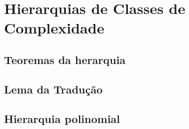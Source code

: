 \chapter{Hierarquias de Classes de Complexidade}




\section{Teoremas da herarquia}

\section{Lema da Tradução}
\label{secao_lema_traducao}



\section{Hierarquia polinomial}
\label{hierarquia_polinomial}
